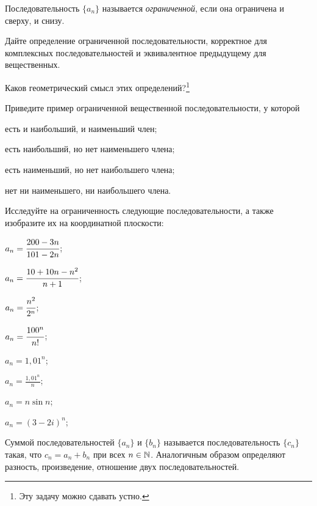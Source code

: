 \documentclass[a4paper, 12pt, num=24, date=06.11.2019]{listok}
\begin{document}
\begin{definition}
    Последовательность $\{a_n\}$ называется \textit{ограниченной}, если она ограничена и сверху, и снизу.
\end{definition}
\begin{problem}
\begin{probparts}
    \item Дайте определение ограниченной последовательности, корректное для комплексных последовательностей и эквивалентное предыдущему для вещественных.
    \item Каков геометрический смысл этих определений?\footnote{Эту задачу можно сдавать устно.}
\end{probparts}
\end{problem}
\begin{problem}
    Приведите пример ограниченной вещественной последовательности, у которой
    \begin{probparts}
        \item есть и наибольший, и наименьший член;
        \item есть наибольший, но нет наименьшего члена;
        \item есть наименьший, но нет наибольшего члена;
        \item нет ни наименьшего, ни наибольшего члена.
    \end{probparts}
\end{problem}
\begin{problem}[$\mathghost$]\label{exfirst}
    Исследуйте на ограниченность следующие последовательности, а также изобразите их на координатной плоскости:
    \begin{multienum}{3}
        \item $a_n = \cfrac{200 - 3n}{101 - 2n}$;
        \item $a_n = \cfrac{10 + 10n - n^2}{n + 1}$;
        \item $a_n = \cfrac{n^2}{2^n}$;
        \item $a_n = \cfrac{100^n}{n!}$;
        \item $a_n = 1,{}01^n$;
        \item $a_n = \frac{1,{}01^n}n$;
        \item $a_n = n \sin{n}$;
        \item $a_n = {(3 - 2i)}^n$;
    \end{multienum}
\end{problem}
\begin{definition}
    Суммой последовательностей $\{a_n\}$ и $\{b_n\}$ называется последовательность $\{c_n\}$ такая,
    что $c_n = a_n + b_n$ при всех $n \in \mathbb{N}$.
    Аналогичным образом определяют разность, произведение, отношение двух последовательностей.
\end{definition}
\end{document}
